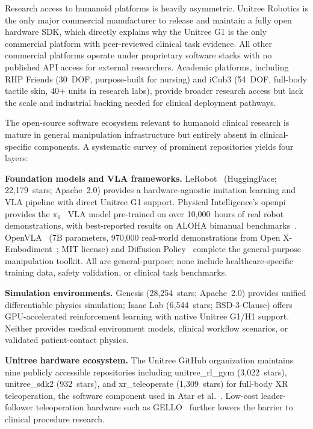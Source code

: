 Research access to humanoid platforms is heavily asymmetric. Unitree Robotics
is the only major commercial manufacturer to release and maintain a fully open
hardware SDK, which directly explains why the Unitree G1 is the only commercial
platform with peer-reviewed clinical task evidence. All other commercial platforms
operate under proprietary software stacks with no published API access for
external researchers. Academic platforms, including RHP Friends (30~DOF, purpose-built
for nursing) and iCub3 (54~DOF, full-body tactile skin, 40+ units in research
labs), provide broader research access but lack the scale and industrial backing
needed for clinical deployment pathways.

The open-source software ecosystem relevant to humanoid clinical research is
mature in general manipulation infrastructure but entirely absent in clinical-specific
components. A systematic survey of prominent repositories yields four layers:

\textbf{Foundation models and VLA frameworks.} LeRobot~\cite{cadene2024lerobot}
(HuggingFace; 22,179~stars; Apache~2.0) provides a hardware-agnostic imitation
learning and VLA pipeline with direct Unitree G1 support. Physical Intelligence's
openpi provides the $\pi_0$~\cite{black2024pi0} VLA model pre-trained on over
10,000~hours of real robot demonstrations, with best-reported results on ALOHA
bimanual benchmarks~\cite{zhao2023act}. OpenVLA~\cite{kim2024openvla} (7B parameters,
970,000 real-world demonstrations from Open X-Embodiment~\cite{openxembodiment2023};
MIT license) and Diffusion Policy~\cite{chi2023diffusion} complete the general-purpose
manipulation toolkit. All are general-purpose; none include healthcare-specific
training data, safety validation, or clinical task benchmarks.

\textbf{Simulation environments.} Genesis (28,254~stars; Apache~2.0) provides
unified differentiable physics simulation; Isaac Lab (6,544~stars; BSD-3-Clause)
offers GPU-accelerated reinforcement learning with native Unitree G1/H1 support.
Neither provides medical environment models, clinical workflow scenarios, or
validated patient-contact physics.

\textbf{Unitree hardware ecosystem.} The Unitree GitHub organization maintains
nine publicly accessible repositories including unitree\_rl\_gym (3,022~stars),
unitree\_sdk2 (932~stars), and xr\_teleoperate (1,309~stars) for full-body
XR teleoperation, the software component used in Atar et al.~\cite{atar2025humanoids}.
Low-cost leader-follower teleoperation hardware such as GELLO~\cite{wu2023gello}
further lowers the barrier to clinical procedure research.

